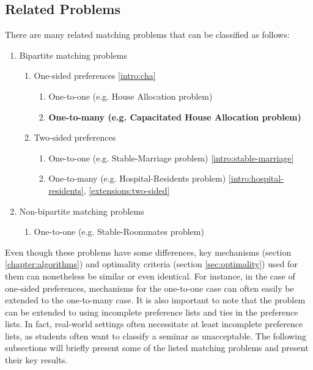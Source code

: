 \subsection{Related Problems}
There are many related matching problems that can be classified as follows:
\begin{enumerate}
    \item Bipartite matching problems
    \begin{enumerate}
        \item One-sided preferences \ref{intro:cha}
        \begin{enumerate}
            \item One-to-one (e.g. House Allocation problem)
            \item \textbf{One-to-many (e.g. Capacitated House Allocation problem)} 
        \end{enumerate}
        \item Two-sided preferences
        \begin{enumerate}
            \item One-to-one (e.g. Stable-Marriage problem) \ref{intro:stable-marriage}
            \item One-to-many (e.g. Hospital-Residents problem) \ref{intro:hospital-residents}, \ref{extensions:two-sided}
        \end{enumerate}
    \end{enumerate}
    \item Non-bipartite matching problems 
    \begin{enumerate}
        \item One-to-one (e.g. Stable-Roommates problem)
    \end{enumerate}
\end{enumerate}
Even though these problems have some differences, key mechanisms (section \ref{chapter:algorithms}) and optimality criteria (section \ref{sec:optimality}) used for them can nonetheless be similar or even identical. For instance, in the case of one-sided preferences, mechanisms for the one-to-one case can often easily be extended to the one-to-many case. It is also important to note that the problem can be extended to using incomplete preference lists and ties in the preference lists. In fact, real-world settings often necessitate at least incomplete preference lists, as students often want to classify a seminar as unacceptable. The following subsections will briefly present some of the listed matching problems and present their key results.  

